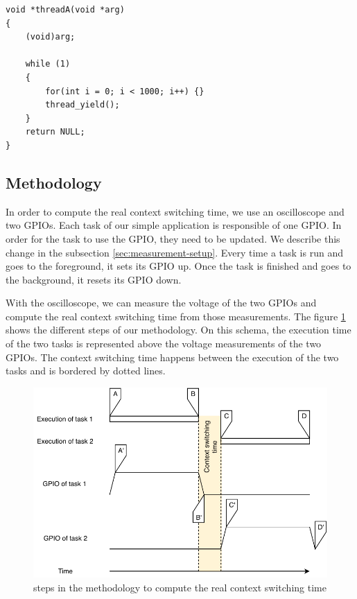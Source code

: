 \begin{lstlisting}[style=CStyle, float, label={lst:simple-task-code-riot}, caption={source code of a task implemented in RIOT for the simple application}]
void *threadA(void *arg)
{
    (void)arg;

    while (1)
    {
        for(int i = 0; i < 1000; i++) {}
        thread_yield();
    }
    return NULL;
}
\end{lstlisting}


\subsection{Methodology}

In order to compute the real context switching time, we use an oscilloscope and two GPIOs.
Each task of our simple application is responsible of one GPIO.
In order for the task to use the GPIO, they need to be updated.
We describe this change in the subsection \ref{sec:measurement-setup}.
Every time a task is run and goes to the foreground, it sets its GPIO up.
Once the task is finished and goes to the background, it resets its GPIO down.

With the oscilloscope, we can measure the voltage of the two GPIOs and compute the real context switching time from those measurements.
The figure \ref{fig:real-context-switching-time-measurement} shows the different steps of our methodology.
On this schema, the execution time of the two tasks is represented above the voltage measurements of the two GPIOs.
The context switching time happens between the execution of the two tasks and is bordered by dotted lines.

\begin{figure}[!ht]
  \centering
  \includegraphics[scale=1]{assets/real-context-switching-time-measurement.pdf}
  \caption{\label{fig:real-context-switching-time-measurement}steps in the methodology to compute the real context switching time}
\end{figure}

